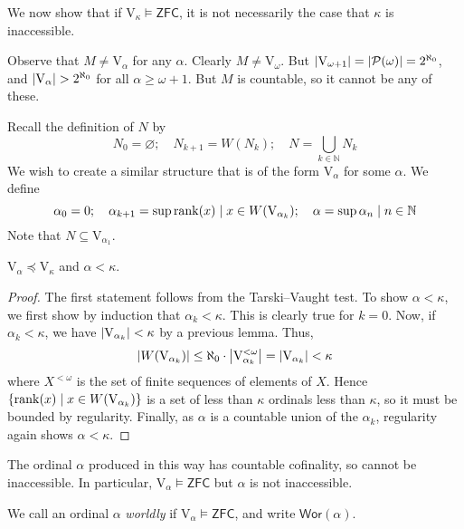 We now show that if \( \mathrm{V}_\kappa \vDash \mathsf{ZFC} \), it is not necessarily the case that \( \kappa \) is inaccessible.

Observe that \( M \neq \mathrm{V}_\alpha \) for any \( \alpha \).
Clearly \( M \neq \mathrm{V}_\omega \).
But \( \abs{\mathrm{V}_{\omega + 1}} = \abs{\mathcal P(\omega)} = 2^{\aleph_0} \), and \( \abs{\mathrm{V}_\alpha} > 2^{\aleph_0} \) for all \( \alpha \geq \omega + 1 \).
But \( M \) is countable, so it cannot be any of these.

Recall the definition of \( N \) by
\[ N_0 = \varnothing;\quad N_{k+1} = W(N_k);\quad N = \bigcup_{k \in \mathbb N} N_k \]
We wish to create a similar structure that is of the form \( \mathrm{V}_\alpha \) for some \( \alpha \).
We define
\[ \alpha_0 = 0;\quad \alpha_{k+1} = \sup{\rank(x) \mid x \in W(\mathrm{V}_{\alpha_k})};\quad \alpha = \sup{\alpha_n \mid n \in \mathbb N} \]
Note that \( N \subseteq \mathrm{V}_{\alpha_1} \).
\begin{theorem}
    \( \mathrm{V}_\alpha \preceq \mathrm{V}_\kappa \) and \( \alpha < \kappa \).
\end{theorem}
\begin{proof}
    The first statement follows from the Tarski--Vaught test.
    To show \( \alpha < \kappa \), we first show by induction that \( \alpha_k < \kappa \).
    This is clearly true for \( k = 0 \).
    Now, if \( \alpha_k < \kappa \), we have \( \abs{\mathrm{V}_{\alpha_k}} < \kappa \) by a previous lemma.
    Thus,
    \[ \abs{W(\mathrm{V}_{\alpha_k})} \leq \aleph_0 \cdot \abs{\mathrm{V}_{\alpha_k}^{<\omega}} = \abs{\mathrm{V}_{\alpha_k}} < \kappa \]
    where \( X^{<\omega} \) is the set of finite sequences of elements of \( X \).
    Hence \( \qty{\rank(x) \mid x \in W(\mathrm{V}_{\alpha_k})} \) is a set of less than \( \kappa \) ordinals less than \( \kappa \), so it must be bounded by regularity.
    Finally, as \( \alpha \) is a countable union of the \( \alpha_k \), regularity again shows \( \alpha < \kappa \).
\end{proof}
\begin{remark}
    The ordinal \( \alpha \) produced in this way has countable cofinality, so cannot be inaccessible.
    In particular, \( \mathrm{V}_\alpha \vDash \mathsf{ZFC} \) but \( \alpha \) is not inaccessible.
\end{remark}
\begin{definition}
    We call an ordinal \( \alpha \) \emph{worldly} if \( \mathrm{V}_\alpha \vDash \mathsf{ZFC} \), and write \( \mathsf{Wor}(\alpha) \).
\end{definition}
